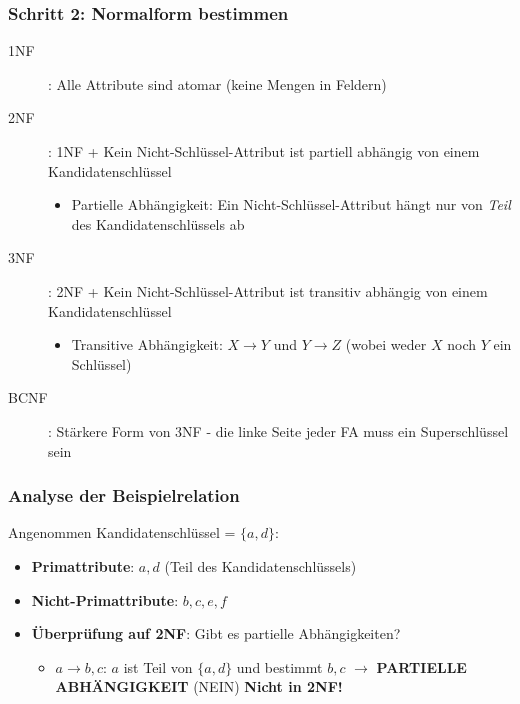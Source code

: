 \documentclass[a4paper]{article}
\begin{document}
\subsubsection{Schritt 2: Normalform bestimmen}

\begin{description}
    \item[1NF]: Alle Attribute sind atomar (keine Mengen in Feldern)
    \item[2NF]: 1NF + Kein Nicht-Schlüssel-Attribut ist partiell abhängig von einem Kandidatenschlüssel
    \begin{itemize}
        \item Partielle Abhängigkeit: Ein Nicht-Schlüssel-Attribut hängt nur von \textit{Teil} des Kandidatenschlüssels ab
    \end{itemize}
    
    \item[3NF]: 2NF + Kein Nicht-Schlüssel-Attribut ist transitiv abhängig von einem Kandidatenschlüssel
    \begin{itemize}
        \item Transitive Abhängigkeit: $X \to Y$ und $Y \to Z$ (wobei weder $X$ noch $Y$ ein Schlüssel)
    \end{itemize}
    
    \item[BCNF]: Stärkere Form von 3NF - die linke Seite jeder FA muss ein Superschlüssel sein
\end{description}

\subsubsection{Analyse der Beispielrelation}

Angenommen Kandidatenschlüssel = $\{a, d\}$:

\begin{itemize}
    \item \textbf{Primattribute}: $a, d$ (Teil des Kandidatenschlüssels)
    \item \textbf{Nicht-Primattribute}: $b, c, e, f$
    
    \item \textbf{Überprüfung auf 2NF}: Gibt es partielle Abhängigkeiten?
    \begin{itemize}
        \item $a \to b, c$: $a$ ist Teil von $\{a, d\}$ und bestimmt $b, c$ 
        $\to$ \textbf{PARTIELLE ABHÄNGIGKEIT} (NEIN) \textbf{Nicht in 2NF!}
    \end{itemize}
\end{itemize}
\end{document}
